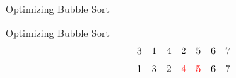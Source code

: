 \begin{frame}{Optimizing Bubble Sort}

  
\end{frame}
\begin{frame}{Optimizing Bubble Sort}
  \begin{align*}
	3\quad 1\quad 4\quad 2\quad 5\quad 6\quad 7\\[3pt]
	1\quad 3\quad 2\quad \textcolor{red}{4}\quad \textcolor{red}{5}\quad 6\quad 7
  \end{align*}

  \begin{center}
  \end{center}
\end{frame}
